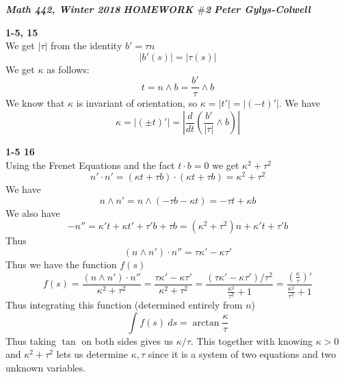 \documentclass[12pt]{article}
\newenvironment{ques}[1]{\textbf{#1}\vspace{1 mm}\\ }{\bigskip}
\theoremstyle{definition}
\renewcommand{\l}{\left }
\renewcommand{\r}{\right }
\begin{document}
\noindent \textit{\textbf{Math 442, Winter 2018}} \hspace{1.3cm}
\textit{\textbf{HOMEWORK $\#$2}} \hspace{1.3cm} \textit{\textbf{Peter
Gylys-Colwell}} 

\vspace{1cm}

\begin{ques}{1-5, 15}
	We get $|\tau|$ from the identity $b' = \tau n$ 
	$$|b'(s)| = |\tau(s)|$$
	We get $\kappa$ as follows:
	$$t = n \wedge b = \frac{b'}{\tau} \wedge b$$
	We know that $\kappa$ is invariant of orientation, so $\kappa = |t'| =
	|(-t)'|$. We have
	$$\kappa = |(\pm t)'| = \l|\frac d {dt}\l(\frac{b'}{|\tau|} \wedge b \r) \r|$$
\end{ques}

\begin{ques}{1-5 16}
	Using the Frenet Equations and the fact $t \cdot b = 0$ we get $\kappa^2 + \tau^2$
	$$n' \cdot n' = (\kappa t + \tau b) \cdot (\kappa t + \tau b) = \kappa^2 +
	\tau^2$$
	We have
	$$n \wedge n' = n \wedge (-\tau b - \kappa t) = -\tau t + \kappa b$$
	We also have 
	$$-n'' = \kappa' t + \kappa t' + \tau' b + \tau b = (\kappa^2 + \tau^2)n +
	\kappa't + \tau'b$$
	Thus
	$$(n \wedge n')\cdot n'' = \tau \kappa' - \kappa \tau'$$
	Thus we have the function $f(s)$
	$$f(s) = \frac{(n \wedge n')\cdot n''}{\kappa^2 + \tau^2} = \frac{\tau \kappa' -
	\kappa \tau'}{\kappa^2 + \tau^2} = \frac{(\tau\kappa' -
	\kappa\tau')/\tau^2}{\frac{\kappa^2}{\tau^2} + 1} =
	\frac{\l(\frac{\kappa}{\tau}\r)'}{\frac{\kappa^2}{\tau^2} + 1}$$
	Thus integrating this function (determined entirely from $n$)
	$$\int f(s)\ ds = \arctan \frac \kappa \tau$$
	Thus taking $\tan$ on both sides gives us $\kappa / \tau$. This together
	with knowing $\kappa > 0$ and $\kappa^2 + \tau^2$ lets us determine
	$\kappa, \tau$ since it is a system of two equations and two unknown variables.
\end{ques}
\end{document}
